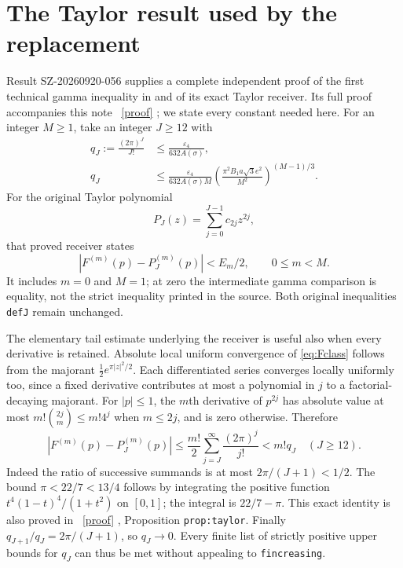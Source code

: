 \documentclass[11pt]{article}
\newcommand{\eps}{\varepsilon}
\begin{document}
\section{The Taylor result used by the replacement}\label{sec:taylor}
Result SZ-20260920-056 supplies a complete independent proof of
the first technical gamma inequality in \cite{AriasII} and of
its exact Taylor receiver. Its full proof accompanies this note
\cite{GammaProof}%
~\href{https://github.com/KokunoYumeto/zeta-function-research-reader/blob/5992ad50c0f2a06921f1fcaded7b4e38097c0739/workbenches/splitzero-tandem/continuations/20260920-original-kernel-mixed-determinants/providers/GAMMA_INEQUALITY.tex\#L1}{[proof]}%
{}; we state every constant needed here.
For an integer $M\ge1$, take an integer $J\ge12$ with
\begin{align}
q_J:=\frac{(2\pi)^J}{J!}
&\le\frac{\eps_4}{632A(\sigma)},\label{eq:J1}\\
q_J&\le\frac{\eps_4}{632A(\sigma)M}
\left(\frac{\pi^2B_1a\sqrt3e^2}{M^2}\right)^{(M-1)/3}.
\label{eq:J2}
\end{align}
For the original Taylor polynomial
\begin{equation}\label{eq:P}
P_J(z)=\sum_{j=0}^{J-1}c_{2j}z^{2j},
\end{equation}
that proved receiver states
\begin{equation}\label{eq:Taylor}
|F^{(m)}(p)-P_J^{(m)}(p)|<E_m/2,
\qquad 0\le m<M.
\end{equation}
It includes $m=0$ and $M=1$; at zero the intermediate gamma
comparison is equality, not the strict inequality printed in
the source. Both original inequalities \texttt{defJ} remain unchanged.

The elementary tail estimate underlying the receiver is useful
also when every derivative is retained. Absolute local uniform
convergence of \eqref{eq:Fclass} follows from the majorant
$\tfrac12 e^{\pi |z|^2/2}$. Each differentiated series converges
locally uniformly too, since a fixed derivative contributes at
most a polynomial in $j$ to a factorial-decaying majorant.
For $|p|\le1$, the $m$th derivative of $p^{2j}$ has absolute
value at most $m!\binom{2j}{m}\le m!4^j$ when $m\le2j$,
and is zero otherwise. Therefore
\begin{equation}\label{eq:directtail}
|F^{(m)}(p)-P_J^{(m)}(p)|
\le\frac{m!}2\sum_{j=J}^\infty\frac{(2\pi)^j}{j!}
<m!q_J\quad(J\ge12).
\end{equation}
Indeed the ratio of successive summands is at most
$2\pi/(J+1)<1/2$. The bound $\pi<22/7<13/4$ follows by
integrating the positive function
$t^4(1-t)^4/(1+t^2)$ on $[0,1]$; the integral is
$22/7-\pi$. This exact identity is also proved in
\cite{GammaProof}%
~\href{https://github.com/KokunoYumeto/zeta-function-research-reader/blob/5992ad50c0f2a06921f1fcaded7b4e38097c0739/workbenches/splitzero-tandem/continuations/20260920-original-kernel-mixed-determinants/providers/GAMMA_INEQUALITY.tex\#L1}{[proof]}%
{}, Proposition \texttt{prop:taylor}.
Finally $q_{J+1}/q_J=2\pi/(J+1)$, so $q_J\to0$.
Every finite list of strictly positive upper bounds for $q_J$
can thus be met without appealing to \texttt{fincreasing}.
\end{document}
